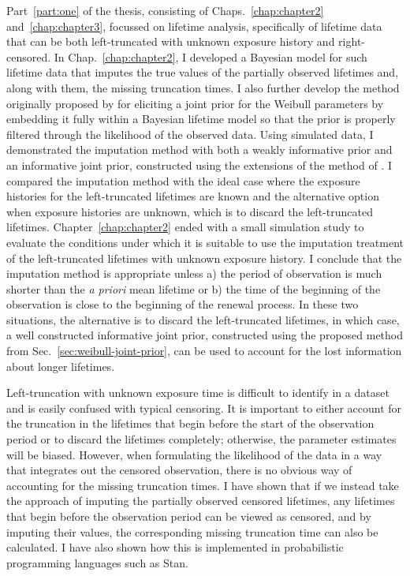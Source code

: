 Part~\ref{part:one} of the thesis, consisting of Chaps.~\ref{chap:chapter2} and~\ref{chap:chapter3}, focussed on lifetime analysis, specifically of lifetime data that can be both left-truncated with unknown exposure history and right-censored. In Chap.~\ref{chap:chapter2}, I developed a Bayesian model for such lifetime data that imputes the true values of the partially observed lifetimes and, along with them, the missing truncation times. I also further develop the method originally proposed by \citet{kaminskiy2005} for eliciting a joint prior for the Weibull parameters by embedding it fully within a Bayesian lifetime model so that the prior is properly filtered through the likelihood of the observed data. Using simulated data, I demonstrated the imputation method with both a weakly informative prior and an informative joint prior, constructed using the extensions of the method of \citet{kaminskiy2005}. I compared the imputation method with the ideal case where the exposure histories for the left-truncated lifetimes are known and the alternative option when exposure histories are unknown, which is to discard the left-truncated lifetimes. Chapter~\ref{chap:chapter2} ended with a small simulation study to evaluate the conditions under which it is suitable to use the imputation treatment of the left-truncated lifetimes with unknown exposure history. I conclude that the imputation method is appropriate unless a) the period of observation is much shorter than the \textit{a priori} mean lifetime or b) the time of the beginning of the observation is close to the beginning of the renewal process. In these two situations, the alternative is to discard the left-truncated lifetimes, in which case, a well constructed informative joint prior, constructed using the proposed method from Sec.~\ref{sec:weibull-joint-prior}, can be used to account for the lost information about longer lifetimes.

Left-truncation with unknown exposure time is difficult to identify in a dataset and is easily confused with typical censoring. It is important to either account for the truncation in the lifetimes that begin before the start of the observation period or to discard the lifetimes completely; otherwise, the parameter estimates will be biased. However, when formulating the likelihood of the data in a way that integrates out the censored observation, there is no obvious way of accounting for the missing truncation times. I have shown that if we instead take the approach of imputing the partially observed censored lifetimes, any lifetimes that begin before the observation period can be viewed as censored, and by imputing their values, the corresponding missing truncation time can also be calculated. I have also shown how this is implemented in probabilistic programming languages such as Stan.

